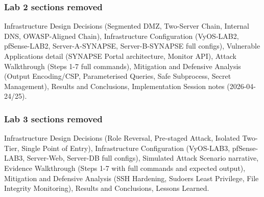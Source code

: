 \documentclass[a4paper,11pt]{article}
\begin{document}
\subsubsection{Lab 2 sections removed}
Infrastructure Design Decisions (Segmented DMZ, Two-Server Chain, Internal DNS,
OWASP-Aligned Chain), Infrastructure Configuration (VyOS-LAB2, pfSense-LAB2,
Server-A-SYNAPSE, Server-B-SYNAPSE full configs), Vulnerable Applications detail
(SYNAPSE Portal architecture, Monitor API), Attack Walkthrough (Steps 1-7 full
commands), Mitigation and Defensive Analysis (Output Encoding/CSP, Parameterised
Queries, Safe Subprocess, Secret Management), Results and Conclusions,
Implementation Session notes (2026-04-24/25).

\subsubsection{Lab 3 sections removed}
Infrastructure Design Decisions (Role Reversal, Pre-staged Attack, Isolated
Two-Tier, Single Point of Entry), Infrastructure Configuration (VyOS-LAB3,
pfSense-LAB3, Server-Web, Server-DB full configs), Simulated Attack Scenario
narrative, Evidence Walkthrough (Steps 1-7 with full commands and expected output),
Mitigation and Defensive Analysis (SSH Hardening, Sudoers Least Privilege,
File Integrity Monitoring), Results and Conclusions, Lessons Learned.
\end{document}
